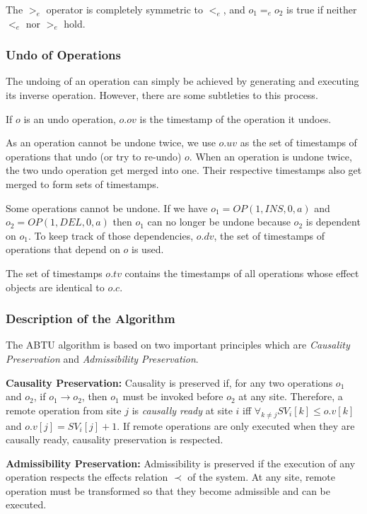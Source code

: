 \documentclass[11pt, a4paper, oneside, openright]{article} %
\begin{document}
The $>_e$ operator is completely symmetric to $<_e$, and $o_1 =_e o_2$ is true if neither $<_e$ nor $>_e$ hold.

\subsubsection{Undo of Operations}

The undoing of an operation can simply be achieved by generating and executing its inverse operation. However, there are some subtleties to this process.

If $o$ is an undo operation, $o.ov$ is the timestamp of the operation it undoes.

As an operation cannot be undone twice, we use $o.uv$ as the set of timestamps of operations that undo (or try to re-undo) $o$. When an operation is undone twice, the two undo operation get merged into one. Their respective timestamps also get merged to form sets of timestamps.

Some operations cannot be undone. If we have $o_1 = OP(1, INS, 0, a)$ and $o_2 = OP(1, DEL, 0, a)$ then $o_1$ can no longer be undone because $o_2$ is dependent on $o_1$. To keep track of those dependencies, $o.dv$, the set of timestamps of operations that depend on $o$ is used.

The set of timestamps $o.tv$ contains the timestamps of all operations whose effect objects are identical to $o.c$.

\subsubsection{Description of the Algorithm}

The ABTU algorithm is based on two important principles which are \textit{Causality Preservation} and \textit{Admissibility Preservation}.

\textbf{Causality Preservation:} Causality is preserved if, for any two operations $o_1$ and $o_2$, if $o_1 \rightarrow o_2$, then $o_1$ must be invoked before $o_2$ at any site. Therefore, a remote operation from site $j$ is \textit{causally ready} at site $i$ iff $\forall_{k\neq j} SV_i[k] \leq o.v[k]$ and $o.v[j] = SV_i[j] + 1$. If remote operations are only executed when they are causally ready, causality preservation is respected.

\textbf{Admissibility Preservation: } Admissibility is preserved if the execution of any operation respects the effects relation $\prec$ of the system. At any site, remote operation must be transformed so that they become admissible and can be executed.
\end{document}
